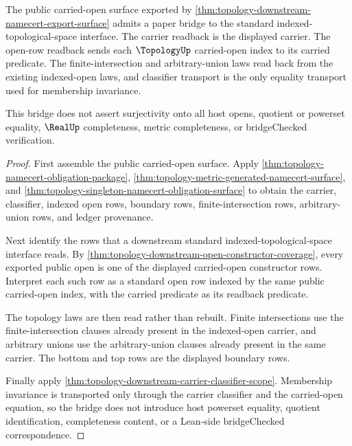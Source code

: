 \begin{theorem}
\label{thm:topology-public-carried-open-standard-bridge}
The public carried-open surface exported by \autoref{thm:topology-downstream-namecert-export-surface} admits a paper bridge to the standard indexed-topological-space interface. The carrier readback is the displayed carrier. The open-row readback sends each $\TopologyUp$ carried-open index to its carried predicate. The finite-intersection and arbitrary-union laws read back from the existing indexed-open laws, and classifier transport is the only equality transport used for membership invariance.

This bridge does not assert surjectivity onto all host opens, quotient or powerset equality, $\RealUp$ completeness, metric completeness, or bridgeChecked verification.
\end{theorem}
\begin{proof}
First assemble the public carried-open surface. Apply \autoref{thm:topology-namecert-obligation-package}, \autoref{thm:topology-metric-generated-namecert-surface}, and \autoref{thm:topology-singleton-namecert-obligation-surface} to obtain the carrier, classifier, indexed open rows, boundary rows, finite-intersection rows, arbitrary-union rows, and ledger provenance.

Next identify the rows that a downstream standard indexed-topological-space interface reads. By \autoref{thm:topology-downstream-open-constructor-coverage}, every exported public open is one of the displayed carried-open constructor rows. Interpret each such row as a standard open row indexed by the same public carried-open index, with the carried predicate as its readback predicate.

The topology laws are then read rather than rebuilt. Finite intersections use the finite-intersection clauses already present in the indexed-open carrier, and arbitrary unions use the arbitrary-union clauses already present in the same carrier. The bottom and top rows are the displayed boundary rows.

Finally apply \autoref{thm:topology-downstream-carrier-classifier-scope}. Membership invariance is transported only through the carrier classifier and the carried-open equation, so the bridge does not introduce host powerset equality, quotient identification, completeness content, or a Lean-side bridgeChecked correspondence.
\end{proof}

